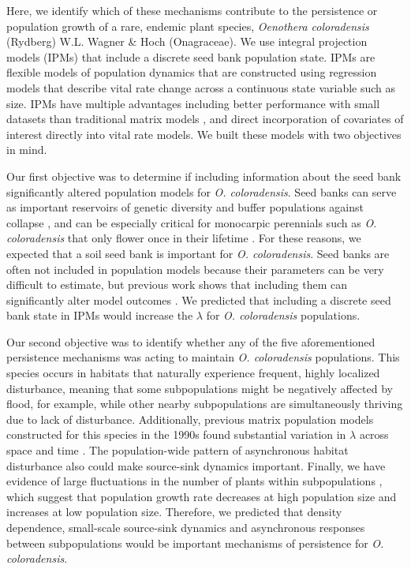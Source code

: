 \documentclass[12pt, letterpaper]{article}
\begin{document}
Here, we identify which of these mechanisms contribute to the persistence or population growth of a rare, endemic plant species, \textit{Oenothera coloradensis} (Rydberg) W.L. Wagner \& Hoch (Onagraceae). We use integral projection models (IPMs) \cite{Easterling2000} that include a discrete seed bank population state. IPMs are flexible models of population dynamics that are constructed using regression models that describe vital rate change across a continuous state variable such as size. IPMs have multiple advantages including better performance with small datasets than traditional matrix models \cite{Ramula2009IntegralHerbs}, and direct incorporation of covariates of interest directly into vital rate models. We built these models with two objectives in mind.

Our first objective was to determine if including information about the seed bank significantly altered population models for \textit{O. coloradensis}. Seed banks can serve as important reservoirs of genetic diversity and buffer populations against collapse \cite{Vitalis2004WhenPerenniality, Jongejans2006WhatRange}, and can be especially critical for monocarpic perennials such as \textit{O. coloradensis} that only flower once in their lifetime \cite{Rees2006}. For these reasons, we expected that a soil seed bank is important for \textit{O. coloradensis}. Seed banks are often not included in population models because their parameters can be very difficult to estimate, but previous work shows that including them can significantly alter model outcomes \cite{Paniw2017, Nguyen2019ConsequencesModels}. We predicted that including a discrete seed bank state in IPMs would increase the $\lambda$ for \textit{O. coloradensis} populations. 

Our second objective was to identify whether any of the five aforementioned persistence mechanisms was acting to maintain \textit{O. coloradensis} populations. This species occurs in habitats that naturally experience frequent, highly localized disturbance, meaning that some subpopulations might be negatively affected by flood, for example, while other nearby subpopulations are simultaneously thriving due to lack of disturbance. Additionally, previous matrix population models constructed for this species in the 1990s found substantial variation in $\lambda$ across space and time \cite{Floyd1998}. The population-wide pattern of asynchronous habitat disturbance also could make source-sink dynamics important. Finally, we have evidence of large fluctuations in the number of plants within subpopulations \cite{Heidel202133-YearWyoming}, which suggest that population growth rate decreases at high population size and increases at low population size. Therefore, we predicted that density dependence, small-scale source-sink dynamics and asynchronous responses between subpopulations would be important mechanisms of persistence for \textit{O. coloradensis}.  
\end{document}
